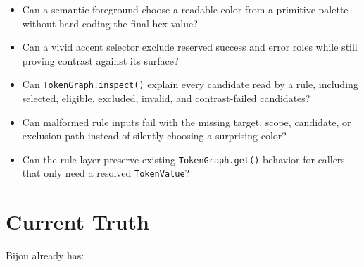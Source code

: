 \begin{itemize}
\tightlist
\item
  Can a semantic foreground choose a readable color from a primitive palette without hard-coding the final hex value?
\item
  Can a vivid accent selector exclude reserved success and error roles while still proving contrast against its surface?
\item
  Can \texttt{T\allowbreak{}o\allowbreak{}k\allowbreak{}e\allowbreak{}n\allowbreak{}G\allowbreak{}r\allowbreak{}a\allowbreak{}p\allowbreak{}h\allowbreak{}.\allowbreak{}i\allowbreak{}n\allowbreak{}s\allowbreak{}p\allowbreak{}e\allowbreak{}c\allowbreak{}t\allowbreak{}(\allowbreak{})} explain every candidate read by a rule, including selected, eligible, excluded, invalid, and contrast-failed candidates?
\item
  Can malformed rule inputs fail with the missing target, scope, candidate, or exclusion path instead of silently choosing a surprising color?
\item
  Can the rule layer preserve existing \texttt{T\allowbreak{}o\allowbreak{}k\allowbreak{}e\allowbreak{}n\allowbreak{}G\allowbreak{}r\allowbreak{}a\allowbreak{}p\allowbreak{}h\allowbreak{}.\allowbreak{}g\allowbreak{}e\allowbreak{}t\allowbreak{}(\allowbreak{})} behavior for callers that only need a resolved \texttt{T\allowbreak{}o\allowbreak{}k\allowbreak{}e\allowbreak{}n\allowbreak{}V\allowbreak{}a\allowbreak{}l\allowbreak{}u\allowbreak{}e}?
\end{itemize}

\section{Current Truth}\label{record-184-current-truth}

Bijou already has:

